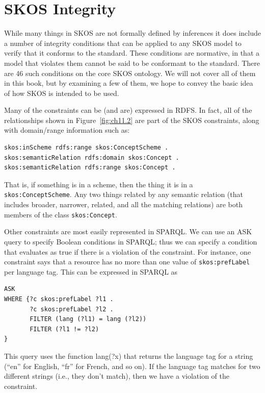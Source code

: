 \section{SKOS Integrity}

While many things in SKOS are not formally defined by inferences it does
include a number of integrity conditions that can be applied to any SKOS
model to verify that it conforms to the standard. These conditions are
normative, in that a model that violates them cannot be said to be
conformant to the standard. There are 46 such conditions on the core
SKOS ontology. We will not cover all of them in this book, but by
examining a few of them, we hope to convey the basic idea of how SKOS is
intended to be used.

Many of the constraints can be (and are) expressed in RDFS. In fact, all
of the relationships shown in Figure~\ref{fig:ch11.2} are part of the SKOS
constraints, along with domain/range information such as:

\begin{lstlisting}
skos:inScheme rdfs:range skos:ConceptScheme .
skos:semanticRelation rdfs:domain skos:Concept .
skos:semanticRelation rdfs:range skos:Concept .
\end{lstlisting}

That is, if something is in a scheme, then the thing it is in a
\texttt{skos:ConceptScheme}. Any two things related by any semantic relation
(that includes broader, narrower, related, and all the matching
relations) are both members of the class \texttt{skos:Concept}.

Other constraints are most easily represented in SPARQL. We can use an
ASK query to specify Boolean conditions in SPARQL; thus we can specify a
condition that evaluates as true if there is a violation of the
constraint. For instance, one constraint says that a resource has no
more than one value of \texttt{skos:prefLabel} per language tag. This can be
expressed in SPARQL as

\begin{lstlisting}
ASK
WHERE {?c skos:prefLabel ?l1 .
       ?c skos:prefLabel ?l2 .
       FILTER (lang (?l1) = lang (?l2))
       FILTER (?l1 != ?l2)
}
\end{lstlisting}

This query uses the function lang(?x) that returns the language tag for
a string (``en'' for English, ``fr'' for French, and so on). If the
language tag matches for two different strings (i.e., they don't match),
then we have a violation of the constraint.

